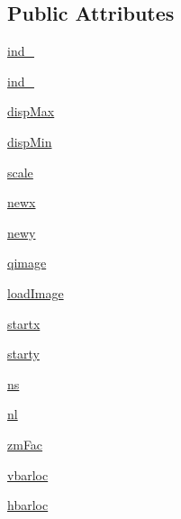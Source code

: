 \subsection*{Public Attributes}
\begin{DoxyCompactItemize}
\item 
\hyperlink{classmy_zm_peak_display_1_1my_zm_peak_display_a2a58f32f3a30578f0d511a206dac4d92}{ind\-\_}
\item 
\hyperlink{classmy_zm_peak_display_1_1my_zm_peak_display_a188042c43b850fa601b05ef9b45983b7}{ind\-\_}
\item 
\hyperlink{classmy_zm_peak_display_1_1my_zm_peak_display_adc972d94702bf72b1aa7f9bafa51a523}{disp\-Max}
\item 
\hyperlink{classmy_zm_peak_display_1_1my_zm_peak_display_a82777e7574c238178144464a0a4c9dd5}{disp\-Min}
\item 
\hyperlink{classmy_zm_peak_display_1_1my_zm_peak_display_a4d79fa930b80664bf9c661c69c90e45a}{scale}
\item 
\hyperlink{classmy_zm_peak_display_1_1my_zm_peak_display_ac30db7d7e88a260a660c73842cc7e70c}{newx}
\item 
\hyperlink{classmy_zm_peak_display_1_1my_zm_peak_display_aa5d3657333093135e384f3bfa49a9ddf}{newy}
\item 
\hyperlink{classmy_zm_peak_display_1_1my_zm_peak_display_a1ff0a93d46b719217c98326afd23efc0}{qimage}
\item 
\hyperlink{classmy_zm_peak_display_1_1my_zm_peak_display_a90d2173fc5c4bda615e1f6e2cda08d89}{load\-Image}
\item 
\hyperlink{classmy_zm_peak_display_1_1my_zm_peak_display_a72f7fc0519471f766cacc379811b3de0}{startx}
\item 
\hyperlink{classmy_zm_peak_display_1_1my_zm_peak_display_a18be92130080c324da24bfd8bb70d1f0}{starty}
\item 
\hyperlink{classmy_zm_peak_display_1_1my_zm_peak_display_ad5645653988974bebc739532eac8ef86}{ns}
\item 
\hyperlink{classmy_zm_peak_display_1_1my_zm_peak_display_aa08f61c355a9ebaf1ee628a10ba72a02}{nl}
\item 
\hyperlink{classmy_zm_peak_display_1_1my_zm_peak_display_a3418f94ca8d8f74f38e83a9857cacd5b}{zm\-Fac}
\item 
\hyperlink{classmy_zm_peak_display_1_1my_zm_peak_display_ae1ca848339601ec3d5cdd9409a683ce9}{vbarloc}
\item 
\hyperlink{classmy_zm_peak_display_1_1my_zm_peak_display_ad44f714b1fc1fc724d16ebdb4d910574}{hbarloc}

\end{DoxyCompactItemize}
